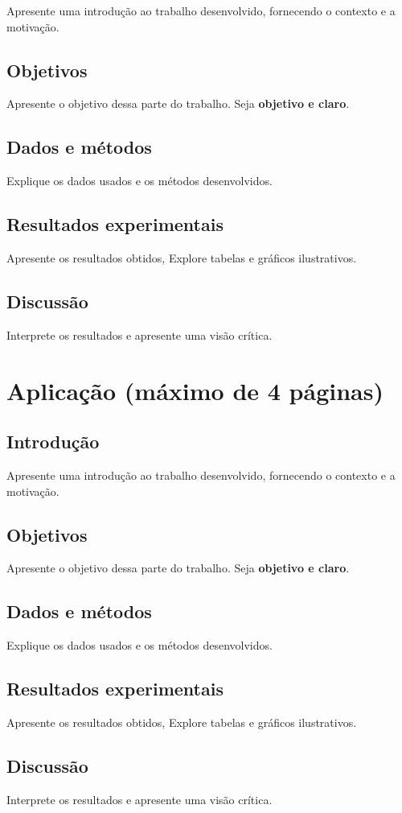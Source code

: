 \documentclass{article}
\begin{document}
Apresente uma introdução ao trabalho desenvolvido, fornecendo o contexto e a motivação.

\subsection{Objetivos}

Apresente o objetivo dessa parte do trabalho. Seja {\bf objetivo e claro}.

\subsection{Dados e métodos}

Explique os dados usados e os métodos desenvolvidos.

\subsection{Resultados experimentais}

Apresente os resultados obtidos, Explore tabelas e gráficos ilustrativos.

\subsection{Discussão}

Interprete os resultados e apresente uma visão crítica.

\newpage

\section{Aplicação (máximo de 4 páginas)}

\subsection{Introdução}

Apresente uma introdução ao trabalho desenvolvido, fornecendo o contexto e a motivação.

\subsection{Objetivos}

Apresente o objetivo dessa parte do trabalho. Seja {\bf objetivo e claro}.

\subsection{Dados e métodos}

Explique os dados usados e os métodos desenvolvidos.

\subsection{Resultados experimentais}

Apresente os resultados obtidos, Explore tabelas e gráficos ilustrativos.

\subsection{Discussão}

Interprete os resultados e apresente uma visão crítica.
\end{document}
